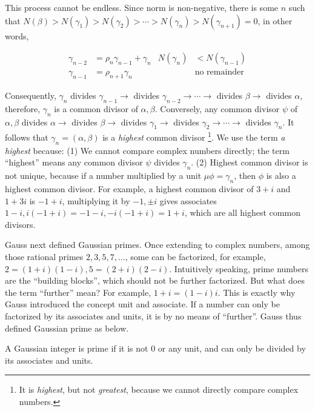 \documentclass[b5paper]{article}
\begin{document}
This process cannot be endless. Since norm is non-negative, there is some $n$ such that $N(\beta) > N(\gamma_1) > N(\gamma_2) > \dotsb > N(\gamma_n) > N(\gamma_{n+1})= 0$, in other words,

\begin{align*}
\gamma_{n-2} &= \rho_n \gamma_{n-1} + \gamma_n & N(\gamma_n) &< N(\gamma_{n-1}) \\
\gamma_{n-1} &= \rho_{n+1} \gamma_n && \text{no remainder}
\end{align*}

Consequently, $\gamma_n$ divides $\gamma_{n-1} \to$ divides $\gamma_{n-2} \to \dotsb \to$ divides $\beta \to$ divides $\alpha$, therefore, $\gamma_n$ is a common divisor of $\alpha, \beta$. Conversely, any common divisor $\psi$ of $\alpha, \beta$ divides $\alpha \to$ divides $\beta \to$ divides $\gamma_1 \to$ divides $\gamma_2 \to \dotsb \to$ divides $\gamma_n$. It follows that $\gamma_n = (\alpha, \beta)$ is a \emph{highest} common divisor \footnote{It is \emph{highest}, but not \emph{greatest}, because we cannot directly compare complex numbers.}. We use the term \emph{a highest} because: (1) We cannot compare complex numbers directly; the term \enquote{highest} means any common divisor $\psi$ divides $\gamma_n$. (2) Highest common divisor is not unique, because if a number multiplied by a unit $\mu\phi = \gamma_n$, then $\phi$ is also a highest common divisor. For example, a highest common divisor of $3 + i$ and $1 + 3i$ is $-1 + i$, multiplying it by $-1, \pm i$ gives associates $1 - i, i(-1 + i) = -1 - i, -i(-1 + i) = 1 + i$, which are all highest common divisors.

Gauss next defined Gaussian primes. Once extending to complex numbers, among those rational primes $2, 3, 5, 7, \dotsc$, some can be factorized, for example, $2 = (1 + i)(1 - i), 5 = (2 + i)(2 - i)$. Intuitively speaking, prime numbers are the \enquote{building blocks}, which should not be further factorized. But what does the term \enquote{further} mean? For example, $1 + i = (1 - i)i$. This is exactly why Gauss introduced the concept unit and associate. If a number can only be factorized by its associates and units, it is by no means of \enquote{further}. Gauss thus defined Gaussian prime as below.

\begin{definition}
A Gaussian integer is prime if it is not 0 or any unit, and can only be divided by its associates and units.
\end{definition}
\end{document}
